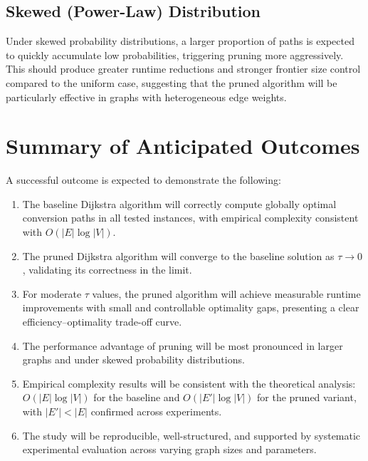 \subsection{Skewed (Power-Law) Distribution}

Under skewed probability distributions, a larger proportion of paths is expected to quickly accumulate low probabilities, triggering pruning more aggressively. This should produce greater runtime reductions and stronger frontier size control compared to the uniform case, suggesting that the pruned algorithm will be particularly effective in graphs with heterogeneous edge weights.

\section{Summary of Anticipated Outcomes}

A successful outcome is expected to demonstrate the following:
\begin{enumerate}
    \item The baseline Dijkstra algorithm will correctly compute globally optimal conversion paths in all tested instances, with empirical complexity consistent with $O(|E| \log |V|)$.
    \item The pruned Dijkstra algorithm will converge to the baseline solution as $\tau \to 0$, validating its correctness in the limit.
    \item For moderate $\tau$ values, the pruned algorithm will achieve measurable runtime improvements with small and controllable optimality gaps, presenting a clear efficiency--optimality trade-off curve.
    \item The performance advantage of pruning will be most pronounced in larger graphs and under skewed probability distributions.
    \item Empirical complexity results will be consistent with the theoretical analysis: $O(|E| \log |V|)$ for the baseline and $O(|E'| \log |V|)$ for the pruned variant, with $|E'| < |E|$ confirmed across experiments.
    \item The study will be reproducible, well-structured, and supported by systematic experimental evaluation across varying graph sizes and parameters.
\end{enumerate}
